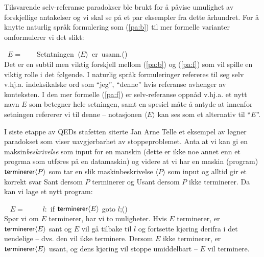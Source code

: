 \documentclass[10pt,twocolumn]{article}
\newcounter{EQ}
\newcommand{\equ}[1]{\refstepcounter{EQ}\vspace{.5ex}\par\noindent\ 
    \hfill #1\hfill{(\theEQ)}\\[.5ex]}
\newcommand{\refp}[1]{(\ref{#1})}
\newcommand{\<}{\langle}
\renewcommand{\>}{\rangle}
\begin{document}
Tilsvarende selv-referanse paradokser ble brukt for {\aa} p{\aa}vise 
umulighet av forskjellige antakelser og vi skal se p{\aa} et par eksempler 
fra dette {\aa}rhundret.
For {\aa} knytte naturlig spr{\aa}k formulering som \refp{pa:b} 
til mer formelle varianter omformulerer vi det slikt:
\equ{$E=$\ \ \ \ Setntningen\ $\<E\>$\ er\ usann.}\label{pa:f}
Det er en subtil men viktig forskjell mellom \refp{pa:b} og \refp{pa:f} som vil
spille en viktig rolle i det f{\o}lgende.
I naturlig spr{\aa}k formuleringer refereres til seg selv 
 v.hj.a. indeksikalske ord som ``jeg'', ``denne'' hvis 
referanse avhenger av konteksten. 
I den mer formelle \refp{pa:f} 
er selv-referanse oppn{\aa}d v.hj.a. et nytt navn $E$ som 
betegner hele setningen, samt en spesiel m{\aa}te {\aa} antyde at innenfor 
setningen refererer vi til denne -- notasjonen $\<E\>$ kan ses som 
et alternativ til ``$E$''.


I siste etappe av QEDs stafetten siterte Jan Arne Telle et eksempel av 
l{\o}gner paradokset som viser uavgj{\o}rbarhet 
av stoppeproblemet. Anta at vi kan gi en maksin{\em beskrivelse} som input for en 
manskin (dette er ikke noe annet enn et progrma som utf{\o}res p{\aa} en 
datamaskin) og videre at vi har en maskin (program) ${\sf 
terminerer}\<P\>$ som tar en slik maskinbeskrivelse $\<P\>$ som input og 
alltid gir et korrekt svar {\sf Sant} dersom $P$ terminerer og {\sf 
Usant} 
dersom $P$ ikke terminerer. Da kan vi lage et nytt program:
\equ{ $E=$\ \ \ \ \ $l:$ if ${\sf terminerer}\<E\>$ goto 
$l$;}\label{pa:t}
Sp{\o}r vi om $E$ terminerer, har vi to muligheter. Hvis $E$ 
terminerer, er ${\sf terminerer}\<E\>$ sant og $E$ vil g{\aa} tilbake 
til $l$ og fortsette kj{\o}ring derifra i det uendelige -- dvs. den 
vil ikke terminere. Dersom $E$ ikke terminerer, er ${\sf 
terminerer}\<E\>$ usant, og dens kj{\o}ring vil stoppe umiddelbart -- 
 $E$ vil terminere.
\end{document}

